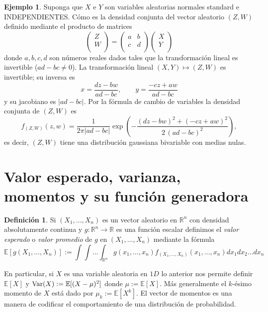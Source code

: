 \documentclass[12pt]{amsart}
\theoremstyle{definition}
\newtheorem{definition}[lemma]{Definición}
\newtheorem{examplex}[lemma]{Ejemplo}
\newcommand{\RR}{\ensuremath{\mathbb{R}}}
\newcommand{\EE}{\ensuremath{\mathbb{E}}}
\begin{document}
\begin{examplex} Suponga que $X$ e $Y$ son variables aleatorias normales standard e INDEPENDIENTES. Cómo es la densidad conjunta del vector aleatorio $(Z,W)$ definido mediante el producto de matrices
\[
\left(\begin{array}{c}
Z \\
W \\
\end{array}\right)=
\left(\begin{array}{cc}
a & b \\
c & d \\
\end{array}\right)
\left(\begin{array}{c}
X \\
Y \\
\end{array}\right)
\]
donde $a,b,c,d$ son números reales dados tales que la transformación lineal es invertible ($ad-bc\neq 0$).
La transformación lineal $(X,Y)\mapsto(Z,W)$ es invertible; su inversa es
\[x=\frac{dz-bw}{ad-bc},\qquad y=\frac{-cz+aw}{ad-bc}\]
y su jacobiano es $|ad-bc|$. Por la fórmula de cambio de variables la densidad conjunta de $(Z,W)$ es
\[f_{(Z,W)}(z,w)=\frac{1}{2\pi|ad-bc|}\exp\left(-\frac{(dz-bw)^2+(-cz+aw)^2}{2\,(ad-bc)^2}\right),\]
es decir, $(Z,W)$ tiene una distribución gaussiana bivariable con medias nulas.
\end{examplex}


\section{Valor esperado, varianza, momentos y su función generadora}

\begin{definition}
Si $(X_1,\dots, X_n)$ es un vector aleatorio en $\RR^n$ con densidad absolutamente continua y $g:\RR^n\rightarrow \RR$ es una función escalar definimos el \emph{valor esperado} o \emph{valor promedio} de $g$ en $(X_1,\dots, X_n)$ mediante la fórmula
\[\EE[g(X_1,\dots, X_n)]:=\int\int\dots\int_{\RR^n} g(x_1,\dots, x_n)f_{(X_1,\dots, X_n)}(x_1,\dots, x_n) dx_1 dx_2\dots dx_n\]
\end{definition}

En particular, si $X$ es una variable aleatoria en $1D$ lo anterior nos permite definir $\EE[X]$ y ${\rm Var}(X):=\EE[(X-\mu)^2]$ donde $\mu:=\EE[X]$. Más generalmente el $k$-ésimo momento de $X$ está dado por $\mu_k:=\EE[X^k]$. El vector de momentos es una manera de codificar el comportamiento de una distribución de probabilidad. 
\end{document}
